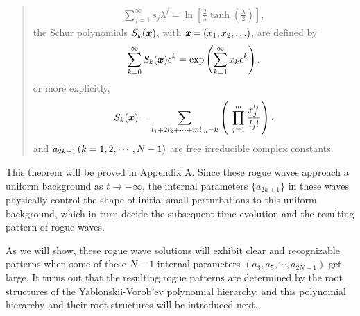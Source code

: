 \documentclass[amsmath,amssymb]{revtex4}
\begin{document}
\begin{quote}
\begin{eqnarray} \label{sexpand}
\sum_{j=1}^{\infty} s_{j}\lambda^{j}=\ln \left[\frac{2}{\lambda}  \tanh \left(\frac{\lambda}{2}\right)\right],
\end{eqnarray}
the Schur polynomials $S_k(\mbox{\boldmath $x$})$, with $\emph{\textbf{x}}=\left( x_{1}, x_{2}, \ldots \right)$, are defined by
\begin{equation} \label{Schurdef}
\sum_{k=0}^{\infty}S_k(\mbox{\boldmath $x$}) \epsilon^k
=\exp\left(\sum_{k=1}^{\infty}x_k \epsilon^k\right),
\end{equation}
or more explicitly,
\begin{equation} \label{Skdef}
S_{k}(\mbox{\boldmath $x$}) =\sum_{l_{1}+2l_{2}+\cdots+ml_{m}=k} \left( \ \prod _{j=1}^{m} \frac{x_{j}^{l_{j}}}{l_{j}!}\right),
\end{equation}
and $a_{2k+1} \hspace{0.05cm} (k=1, 2, \cdots, N-1)$ are free irreducible complex constants.
\end{quote}
This theorem will be proved in Appendix A. Since these rogue waves approach a uniform background as $t\to -\infty$, the internal parameters $\{a_{2k+1}\}$ in these waves physically control the shape of initial small perturbations to this uniform background, which in turn decide the subsequent time evolution and the resulting pattern of rogue waves.

As we will show, these rogue wave solutions will exhibit clear and recognizable patterns when some of these $N-1$ internal parameters $(a_3, a_5, \cdots, a_{2N-1})$ get large. It turns out that the resulting rogue patterns are determined by the root structures of the Yablonskii-Vorob'ev polynomial hierarchy, and this polynomial hierarchy and their root structures will be introduced next.
\end{document}

